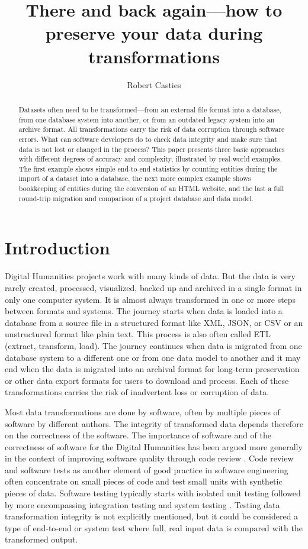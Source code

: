 \documentclass[final]{anthology-ch} %
\title{There and back again---how to preserve your data during transformations}
\author[1]{Robert Casties}[
  orcid=0009-0008-9370-1303
]
\affiliation{1}{Digital Humanities Team, Max Planck Institute for History of Science, Berlin, Germany}
\begin{document}
\maketitle

\begin{abstract}
Datasets often need to be transformed---from an external file format into a database, from one database system into another, or from an outdated legacy system into an archive format. All transformations carry the risk of data corruption through software errors. What can software developers do to check data integrity and make sure that data is not lost or changed in the process? This paper presents three basic approaches with different degrees of accuracy and complexity, illustrated by real-world examples. The first example shows simple end-to-end statistics by counting entities during the import of a dataset into a database, the next more complex example shows bookkeeping of entities during the conversion of an HTML website, and the last a full round-trip migration and comparison of a project database and data model.
\end{abstract}

\section{Introduction}

Digital Humanities projects work with many kinds of data. But the data is very rarely created, processed, visualized, backed up and archived in a single format in only one computer system. It is almost always transformed in one or more steps between formats and systems. The journey starts when data is loaded into a database from a source file in a structured format like XML, JSON, or CSV or an unstructured format like plain text. This process is also often called ETL (extract, transform, load). The journey continues when data is migrated from one database system to a different one or from one data model to another and it may end when the data is migrated into an archival format for long-term preservation or other data export formats for users to download and process. Each of these transformations carries the risk of inadvertent loss or corruption of data.

Most data transformations are done by software, often by multiple pieces of software by different authors. The integrity of transformed data depends therefore on the correctness of the software. The importance of software and of the correctness of software for the Digital Humanities has been argued more generally in  the context of improving software quality through code review \autocite{damerow_code_2025}. Code review and software tests as another element of good practice in software engineering often concentrate on small pieces of code and test small units with synthetic pieces of data. Software testing typically starts with isolated unit testing followed by more encompassing integration testing and system testing \autocite{leloudas_introduction_2023}. Testing data transformation integrity is not explicitly mentioned, but it could be considered a type of end-to-end or system test where full, real input data is compared with the transformed output.
\end{document}
